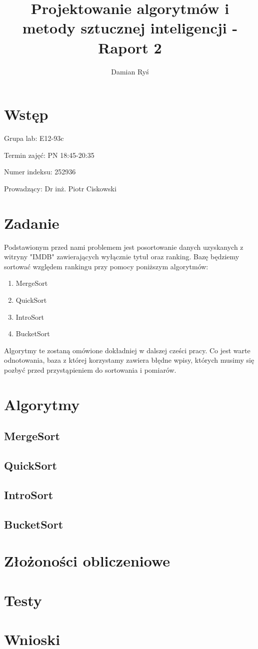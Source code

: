 \documentclass{article}
\title{Projektowanie algorytmów i metody sztucznej inteligencji - Raport 2}
\author{Damian Ryś}
\begin{document}
\maketitle


\tableofcontents
\section{Wstęp}
\hspace{0.5cm}Grupa lab: E12-93c 

Termin zajęć: PN 18:45-20:35

Numer indeksu: 252936

Prowadzący: Dr inż. Piotr Ciskowski
\newpage
\section{Zadanie}
Podstawionym przed nami problemem jest posortowanie danych
uzyskanych z witryny "IMDB" zawierających wyłącznie tytuł oraz ranking.
Bazę będziemy sortować względem rankingu przy pomocy poniższym algorytmów:
\begin{enumerate}
    \item MergeSort
    \item QuickSort
    \item IntroSort
    \item BucketSort
\end{enumerate}
Algorytmy te zostaną omówione dokładniej w dalszej cześci pracy.
Co jest warte odnotowania, baza z której korzystamy zawiera błędne wpisy, których
musimy się pozbyć przed przystąpieniem do sortowania i pomiarów.

\section{Algorytmy}
\subsection{MergeSort}
\subsection{QuickSort}
\subsection{IntroSort}
\subsection{BucketSort}


\section{Złożoności obliczeniowe}

\section{Testy}

\section{Wnioski}

\section{}
\end{document}
